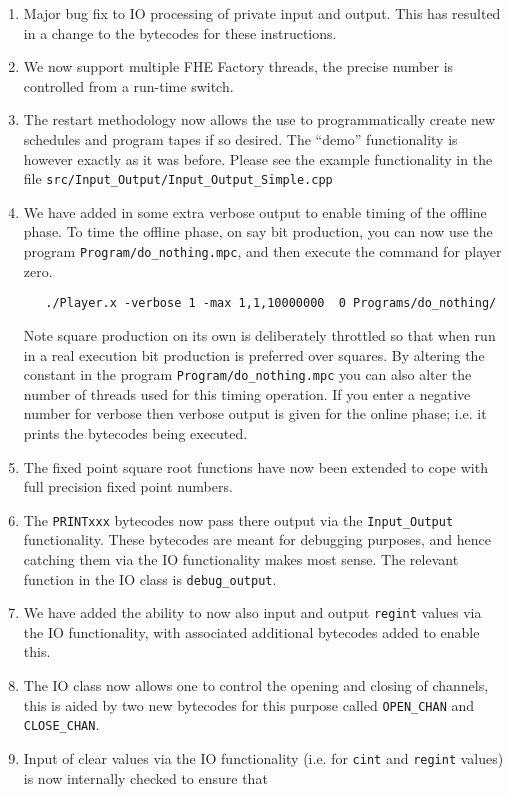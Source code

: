 \begin{enumerate}
\item Major bug fix to IO processing of private input and output.
This has resulted in a change to the bytecodes for these instructions.
\item We now support multiple FHE Factory threads, the precise number
is controlled from a run-time switch.
\item The restart methodology now allows the use to programmatically
create new schedules and program tapes if so desired. The
``demo'' functionality is however exactly as it was before.
Please see the example functionality in the file
\verb+src/Input_Output/Input_Output_Simple.cpp+
\item We have added in some extra verbose output to enable timing of the
offline phase. To time the offline phase, on say bit production,
you can now use the program \verb+Program/do_nothing.mpc+, and then
execute the command for player zero.
\begin{verbatim}
   ./Player.x -verbose 1 -max 1,1,10000000  0 Programs/do_nothing/
\end{verbatim}
Note square production on its own is deliberately throttled
so that when run in a real execution bit production is preferred
over squares.
By altering the constant in the program  \verb+Program/do_nothing.mpc+
you can also alter the number of threads used for this timing operation.
If you enter a negative number for verbose then verbose output
is given for the online phase; i.e. it prints the bytecodes being
executed.
\item The fixed point square root functions have now been extended to
cope with full precision fixed point numbers.
\item The \verb+PRINTxxx+ bytecodes now pass there output via the
\verb+Input_Output+ functionality. These bytecodes are meant for
debugging purposes, and hence catching them via the IO functionality
makes most sense. The relevant function in the IO class
is \verb+debug_output+.
\item We have added the ability to now also input and output \verb+regint+
values via the IO functionality, with associated additional bytecodes
added to enable this.
\item The IO class now allows one to control the opening and closing of
channels, this is aided by two new bytecodes for this purpose
called \verb+OPEN_CHAN+ and \verb+CLOSE_CHAN+.
\item Input of clear values via the IO functionality (i.e.
for \verb+cint+ and \verb+regint+ values) is now internally checked to ensure that

\end{enumerate}

